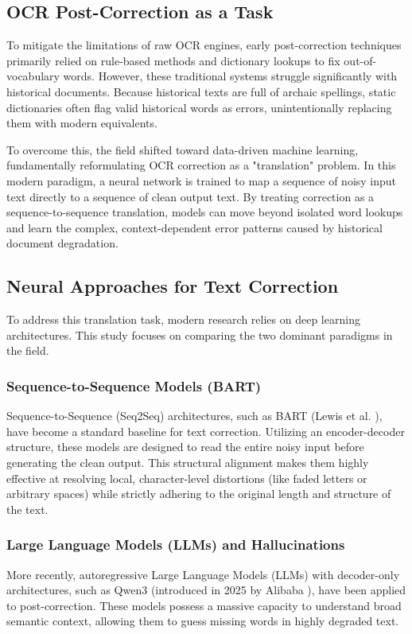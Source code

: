 \documentclass[11pt]{extarticle}
\begin{document}
\subsection{OCR Post-Correction as a Task}
To mitigate the limitations of raw OCR engines, early post-correction techniques primarily relied on rule-based methods and dictionary lookups to fix out-of-vocabulary words. However, these traditional systems struggle significantly with historical documents. Because historical texts are full of archaic spellings, static dictionaries often flag valid historical words as errors, unintentionally replacing them with modern equivalents.

To overcome this, the field shifted toward data-driven machine learning, fundamentally reformulating OCR correction as a "translation" problem. In this modern paradigm, a neural network is trained to map a sequence of noisy input text directly to a sequence of clean output text. By treating correction as a sequence-to-sequence translation, models can move beyond isolated word lookups and learn the complex, context-dependent error patterns caused by historical document degradation.

\subsection{Neural Approaches for Text Correction}
To address this translation task, modern research relies on deep learning architectures. This study focuses on comparing the two dominant paradigms in the field.

\subsubsection{Sequence-to-Sequence Models (BART)}
Sequence-to-Sequence (Seq2Seq) architectures, such as BART (Lewis et al. \cite{lewis2019bartdenoisingsequencetosequencepretraining}), have become a standard baseline for text correction. Utilizing an encoder-decoder structure, these models are designed to read the entire noisy input before generating the clean output. This structural alignment makes them highly effective at resolving local, character-level distortions (like faded letters or arbitrary spaces) while strictly adhering to the original length and structure of the text.

\subsubsection{Large Language Models (LLMs) and Hallucinations}
More recently, autoregressive Large Language Models (LLMs) with decoder-only architectures, such as Qwen3 (introduced in 2025 by Alibaba \cite{yang2025qwen3technicalreport}), have been applied to post-correction. These models possess a massive capacity to understand broad semantic context, allowing them to guess missing words in highly degraded text. 
\end{document}
